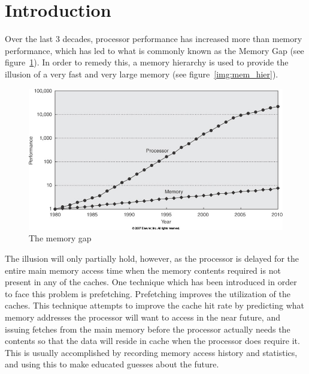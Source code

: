 
\section{Introduction}
\label{sec:introduction}
Over the last 3 decades, processor performance has increased more than memory performance,
which has led to what is commonly known as the Memory Gap (see figure~\ref{img:mem_gap}). In order to remedy this, a memory
hierarchy is used to provide the illusion of a very fast and very
large memory (see figure~\ref{img:mem_hier}). 

\begin{figure}[H]
	\centering
	\includegraphics[scale=0.3]{./img/mem_gap}
	\caption{The memory gap}
	\label{img:mem_gap}
\end{figure}

The illusion will only partially hold, however, as the processor is
delayed for the entire main memory access time when the memory contents required
is not present in any of the caches. One technique
which has been introduced in order to face this problem is prefetching. Prefetching improves the utilization of the caches. This technique
attempts to improve the cache hit rate by predicting what memory
addresses the processor will want to access in the near future, and
issuing fetches from the main memory before the processor actually
needs the contents so that the data will reside in cache when the
processor does require it. This is usually accomplished by recording
memory access history and statistics, and using this to make educated
guesses about the future.\cite{Grannas} 

